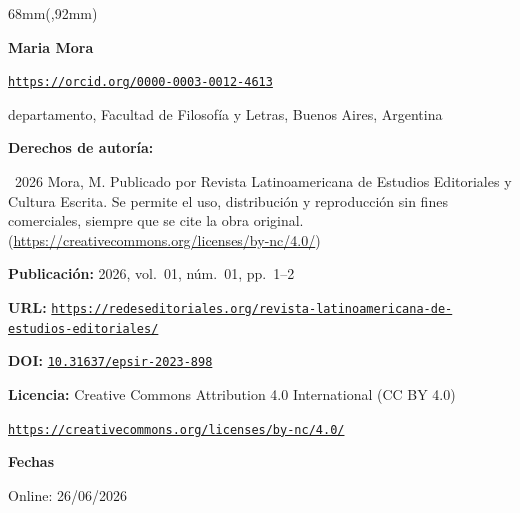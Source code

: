 \begin{textblock*}{68mm}(\gbbloquex,92mm)
{\setlength{\leftskip}{0pt}\setlength{\parindent}{0pt}%
\noindent\begin{minipage}[t]{68mm}
\sffamily\small\setlength{\parskip}{1pt}
{\bfseries\color{azulrevista}Maria Mora}\par
{\scriptsize\texttt{\href{https://orcid.org/0000-0003-0012-4613}{https://orcid.org/0000-0003-0012-4613}}}\par
departamento, Facultad de Filosofía y Letras, Buenos Aires, Argentina\par
\vspace{6pt}
{\bfseries\color{azulrevista!70}Derechos de autor\'ia:}\par
\textcopyright\ 2026 Mora, M. Publicado por Revista Latinoamericana de Estudios Editoriales y Cultura Escrita. Se permite el uso, distribución y reproducción sin fines comerciales, siempre que se cite la obra original. (\href{https://creativecommons.org/licenses/by-nc/4.0/}{https://creativecommons.org/licenses/by-nc/4.0/})\par\vspace{6pt}
{\bfseries\color{azulrevista!70}Publicación:} 2026, vol.~01, n\'um.~01, pp.~1--2\par\vspace{6pt}
{\bfseries\color{azulrevista!70}URL:} {\scriptsize\texttt{\href{https://redeseditoriales.org/revista-latinoamericana-de-estudios-editoriales/}{https://redeseditoriales.org/revista-latinoamericana-de-estudios-editoriales/}}}\par\vspace{6pt}
{\bfseries\color{azulrevista!70}DOI:} {\scriptsize\texttt{\href{https://doi.org/10.31637/epsir-2023-898}{10.31637/epsir-2023-898}}}\par\vspace{6pt}
{\bfseries\color{azulrevista!70}Licencia:} Creative Commons Attribution 4.0 International (CC BY 4.0)\par
{\scriptsize\texttt{\href{https://creativecommons.org/licenses/by-nc/4.0/}{https://creativecommons.org/licenses/by-nc/4.0/}}}\par
\vspace{6pt}
{\bfseries\color{azulrevista!70}Fechas}\par\vspace{2pt}
Online: 26/06/2026\par
\vspace{6pt}
\vspace{6pt}

\end{minipage}}
\end{textblock*}
